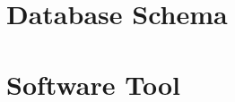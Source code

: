 \section{Database Schema}
\label{implementation:section:database}


\section{Software Tool}
\label{implementation:section:tool}